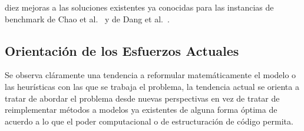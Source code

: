 diez mejoras a las soluciones existentes ya conocidas para las instancias de benchmark de Chao et al.~\cite{TOPresume} y de Dang et al.~\cite{dang2013effective}.

\subsection{Orientaci\'on de los Esfuerzos Actuales}

Se observa cl\'aramente una tendencia a reformular matem\'aticamente el modelo o las heur\'isticas con las que se trabaja el problema, la tendencia actual se orienta a tratar de abordar el problema desde nuevas perspectivas en vez de tratar de reimplementar m\'etodos a modelos ya existentes de alguna forma \'optima de acuerdo a lo que el poder computacional o de estructuraci\'on de c\'odigo permita.
